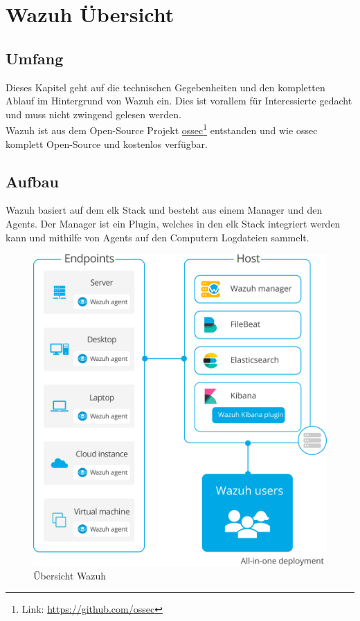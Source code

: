 \chapter{Wazuh Übersicht}
\section{Umfang}
Dieses Kapitel geht auf die technischen Gegebenheiten und den kompletten Ablauf im Hintergrund von Wazuh ein.
Dies ist vorallem für Interessierte gedacht und muss nicht zwingend gelesen werden.\\

Wazuh ist aus dem Open-Source Projekt \href{https://github.com/ossec}{ossec}\footnote{Link: \href{https://github.com/ossec}{https://github.com/ossec}} entstanden und wie ossec komplett Open-Source und kostenlos verfügbar.

\section{Aufbau}

\begin{minipage}{0.4\linewidth}
Wazuh basiert auf dem \acrfull{elk} Stack und besteht aus einem Manager und den Agents. 
Der Manager ist ein Plugin, welches in den \acrshort{elk} Stack integriert werden kann und mithilfe von Agents auf den Computern Logdateien sammelt.

\end{minipage}
\begin{minipage}{0.6\linewidth}
    \begin{figure}[H]
        \centering
        \includegraphics[width=0.8\linewidth]{../img/aufbau-wazuh.png}
        \caption[Übersicht Wazuh]{Übersicht Wazuh\footnotemark}
    \end{figure}
    
\end{minipage}



